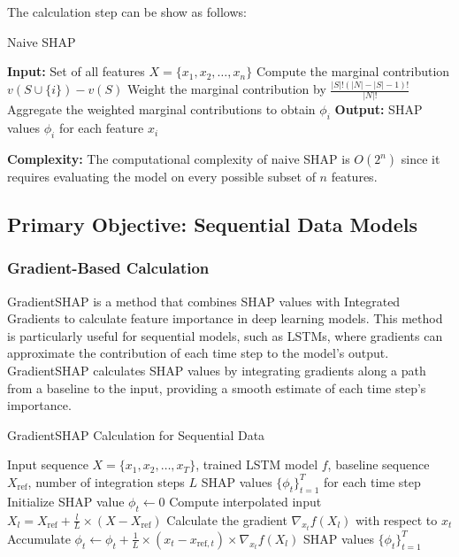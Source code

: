 The calculation step can be show as follows:
\begin{algorithm}[H]
\label{algo:naive}
\caption{Naive SHAP}
\begin{algorithmic}[1]
\State \textbf{Input:} Set of all features $X = \{x_1, x_2, \ldots, x_n\}$
        \State Compute the marginal contribution $v(S \cup \{i\}) - v(S)$
        \State Weight the marginal contribution by $\frac{|S|!(|N| - |S| - 1)!}{|N|!}$
    \EndFor
    \State Aggregate the weighted marginal contributions to obtain $\phi_i$
\EndFor
\State \textbf{Output:} SHAP values $\phi_i$ for each feature $x_i$
\end{algorithmic}
\end{algorithm}

\textbf{Complexity:}
The computational complexity of naive SHAP is $O(2^n)$ since it requires evaluating the model on every possible subset of $n$ features.

\subsection{Primary Objective: Sequential Data Models}

\subsubsection{Gradient-Based Calculation}

GradientSHAP is a method that combines SHAP values with Integrated Gradients to calculate feature importance in deep learning models. This method is particularly useful for sequential models, such as LSTMs, where gradients can approximate the contribution of each time step to the model’s output. GradientSHAP calculates SHAP values by integrating gradients along a path from a baseline to the input, providing a smooth estimate of each time step's importance.

\begin{algorithm}
\caption{GradientSHAP Calculation for Sequential Data}
\begin{algorithmic}[1]
\Require Input sequence $X = \{x_1, x_2, \ldots, x_T\}$, trained LSTM model $f$, baseline sequence $X_\text{ref}$, number of integration steps $L$
\Ensure SHAP values $\{\phi_t\}_{t=1}^T$ for each time step
    \State Initialize SHAP value $\phi_t \gets 0$
        \State Compute interpolated input $X_l = X_\text{ref} + \frac{l}{L} \times (X - X_\text{ref})$
        \State Calculate the gradient $\nabla_{x_t} f(X_l)$ with respect to $x_t$
        \State Accumulate $\phi_t \gets \phi_t + \frac{1}{L} \times (x_t - x_{\text{ref}, t}) \times \nabla_{x_t} f(X_l)$
    \EndFor
\EndFor
\State \Return SHAP values $\{\phi_t\}_{t=1}^T$
\end{algorithmic}
\end{algorithm}


